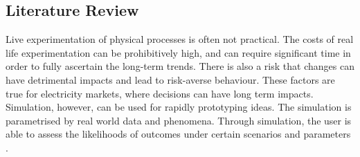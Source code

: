 \subsection{Literature Review}



Live experimentation of physical processes is often not practical. The costs of real life experimentation can be prohibitively high, and can require significant time in order to fully ascertain the long-term trends. There is also a risk that changes can have detrimental impacts and lead to risk-averse behaviour. These factors are true for electricity markets, where decisions can have long term impacts. Simulation, however, can be used for rapidly prototyping ideas. The simulation is parametrised by real world data and phenomena. Through simulation, the user is able to assess the likelihoods of outcomes under certain scenarios and parameters \cite{Law:603360}.



